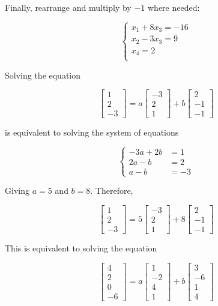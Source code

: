 Finally, rearrange and multiply by $-1$ where needed:

$$
\begin{cases}
    x_1 + 8x_3 = -16 \\
    x_2 - 3x_3 = 9 \\
    x_4 = 2 \\
\end{cases}
$$



Solving the equation 

$$
\begin{bmatrix}1 \\ 2 \\ -3\end{bmatrix} = a \begin{bmatrix}-3 \\ 2 \\ 1\end{bmatrix} + b \begin{bmatrix}2 \\ -1 \\ -1\end{bmatrix}
$$

is equivalent to solving the system of equations

$$
\begin{cases}
    -3a + 2b &= 1 \\
    2a - b &= 2 \\
    a - b &= -3
\end{cases}
$$

Giving $a = 5$ and $b = 8$. Therefore, 

$$
\begin{bmatrix}1 \\ 2 \\ -3\end{bmatrix} = 5 \begin{bmatrix}-3 \\ 2 \\ 1\end{bmatrix} + 8 \begin{bmatrix}2 \\ -1 \\ -1\end{bmatrix}
$$


This is equivalent to solving the equation

$$
\begin{bmatrix}4 \\ 2 \\ 0 \\ -6\end{bmatrix} = a \begin{bmatrix}1 \\ -2 \\ 4 \\ 1\end{bmatrix} + b \begin{bmatrix}3 \\ -6 \\ 1 \\ 4\end{bmatrix}
$$

